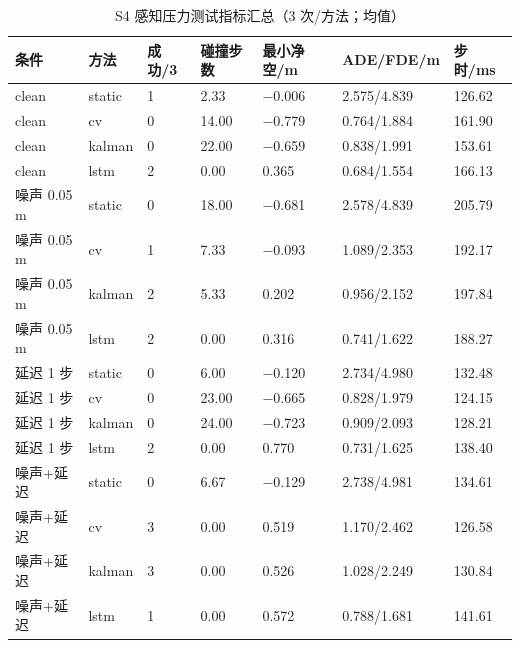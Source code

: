 \documentclass[11pt,a4paper]{ctexart}
\begin{document}
\begin{table}[t]
\centering
\small
\caption{S4 感知压力测试指标汇总（3 次/方法；均值）}
\label{tab:table-7}
\begin{tabularx}{\linewidth}{YYYYYYY}
\toprule
条件 & 方法 & 成功/3 & 碰撞步数 & 最小净空/m & ADE/FDE/m & 步时/ms \\
\midrule
clean & static & 1 & 2.33 & −0.006 & 2.575/4.839 & 126.62 \\
clean & cv & 0 & 14.00 & −0.779 & 0.764/1.884 & 161.90 \\
clean & kalman & 0 & 22.00 & −0.659 & 0.838/1.991 & 153.61 \\
clean & lstm & 2 & 0.00 & 0.365 & 0.684/1.554 & 166.13 \\
噪声 0.05 m & static & 0 & 18.00 & −0.681 & 2.578/4.839 & 205.79 \\
噪声 0.05 m & cv & 1 & 7.33 & −0.093 & 1.089/2.353 & 192.17 \\
噪声 0.05 m & kalman & 2 & 5.33 & 0.202 & 0.956/2.152 & 197.84 \\
噪声 0.05 m & lstm & 2 & 0.00 & 0.316 & 0.741/1.622 & 188.27 \\
延迟 1 步 & static & 0 & 6.00 & −0.120 & 2.734/4.980 & 132.48 \\
延迟 1 步 & cv & 0 & 23.00 & −0.665 & 0.828/1.979 & 124.15 \\
延迟 1 步 & kalman & 0 & 24.00 & −0.723 & 0.909/2.093 & 128.21 \\
延迟 1 步 & lstm & 2 & 0.00 & 0.770 & 0.731/1.625 & 138.40 \\
噪声+延迟 & static & 0 & 6.67 & −0.129 & 2.738/4.981 & 134.61 \\
噪声+延迟 & cv & 3 & 0.00 & 0.519 & 1.170/2.462 & 126.58 \\
噪声+延迟 & kalman & 3 & 0.00 & 0.526 & 1.028/2.249 & 130.84 \\
噪声+延迟 & lstm & 1 & 0.00 & 0.572 & 0.788/1.681 & 141.61 \\
\bottomrule
\end{tabularx}
\end{table}
\end{document}
